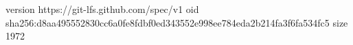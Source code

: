 version https://git-lfs.github.com/spec/v1
oid sha256:d8aa495552830cc6a0fe8fdbf0ed343552e998ee784eda2b214fa3f6fa534fc5
size 1972

